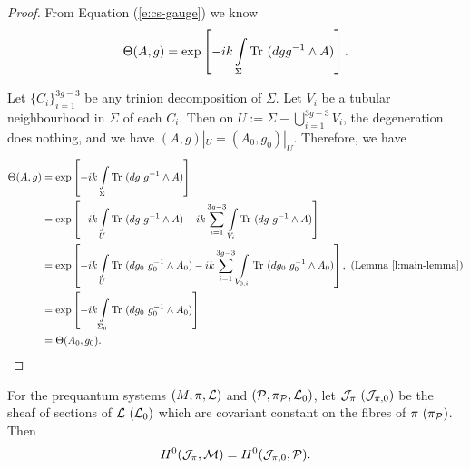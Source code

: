 	\begin{proof}
		From Equation (\ref{e:cs-gauge}) we know
		\begin{equation}
			\Theta(A,g) = \exp\left[-ik\int\limits_\Sigma \text{Tr }(dg g^{-1}\wedge A)\right].
		\end{equation}
		
		Let $\{C_i\}_{i=1}^{3g-3}$ be any trinion decomposition of $\Sigma$. Let $V_i$ be a tubular neighbourhood in $\Sigma$ of each $C_i$. Then on $U:= \Sigma - \bigcup_{i=1}^{3g-3}V_i$, the degeneration does nothing, and we have $(A,g)|_U = (A_0,g_0)|_U$. Therefore, we have
		\begin{align*}
				\Theta(A,g) &= \exp\left[-ik\int\limits_\Sigma \text{Tr }(dg~ g^{-1}\wedge A)\right]\\
				&= \exp\left[-ik\int\limits_U \text{Tr }(dg~g^{-1}\wedge A)
				-ik \sum_{i=1}^{3g-3}\int\limits_{V_i} \text{Tr }(dg~g^{-1}\wedge A)\right]\\
				&= \exp\left[-ik\int\limits_U \text{Tr }(dg_0~g_0^{-1}\wedge A_0)
				-ik \sum_{i=1}^{3g-3}\int\limits_{V_{0,i}} \text{Tr }(dg_0~g_0^{-1}\wedge A_0)\right],~ (\text{Lemma } \ref{l:main-lemma})\\
				&= \exp\left[-ik\int\limits_{\Sigma_0} \text{Tr }(dg_0~ g_0^{-1}\wedge A_0)\right]\\
				&= \Theta(A_0,g_0).
		\end{align*}
	\end{proof}
	\begin{theorem}
		For the prequantum systems $(M,\pi,\mathcal{L})$ and $(\mathcal{P},\pi_{\mathcal{P}}, \mathcal{L}_0)$, let $\mathcal{J}_\pi ~(\mathcal{J}_{\pi,0})$ be the sheaf of sections of $\mathcal{L} ~(\mathcal{L}_0)$ which are covariant constant on the fibres of $\pi ~(\pi_{\mathcal{P}})$. Then
		\begin{equation}
			H^0(\mathcal{J}_\pi, \mathcal{M}) = H^0(\mathcal{J}_{\pi,0}, \mathcal{P}).
		\end{equation}
	\end{theorem}

